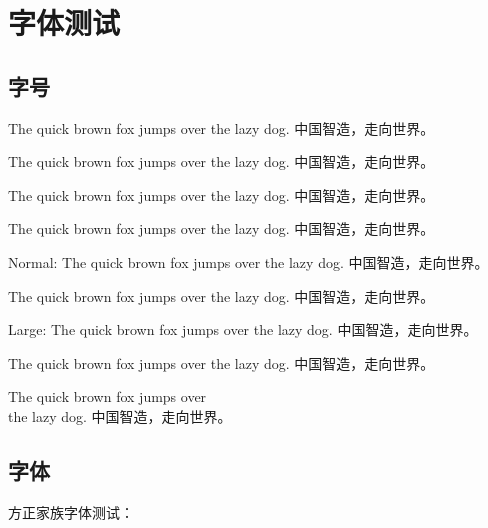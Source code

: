 
\chapter{字体测试}

\section{字号}

{\tiny The quick brown fox jumps over the lazy dog. 中国智造，走向世界。}

{\scriptsize The quick brown fox jumps over the lazy dog. 中国智造，走向世界。}

{\footnotesize The quick brown fox jumps over the lazy dog. 中国智造，走向世界。}

{\small The quick brown fox jumps over the lazy dog. 中国智造，走向世界。}

{\normalsize Normal: The quick brown fox jumps over the lazy dog. 中国智造，走向世界。}

{\large The quick brown fox jumps over the lazy dog. 中国智造，走向世界。}

{\Large Large: The quick brown fox jumps over the lazy dog. 中国智造，走向世界。}

{\LARGE The quick brown fox jumps over the lazy dog. 中国智造，走向世界。}

{\Huge The quick brown fox jumps over\\ the lazy dog. 中国智造，走向世界。}

\section{字体}

方正家族字体测试：







